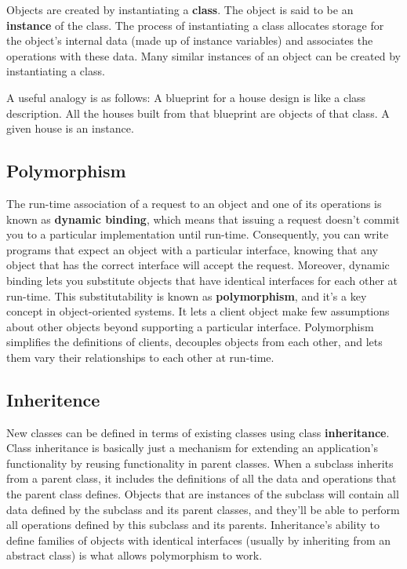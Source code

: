 \documentclass{article}
\begin{document}
Objects are created by instantiating a \textbf{class}. The object is said to be an \textbf{instance} of the class. The process of instantiating a class allocates storage for the object's internal data (made up of instance variables) and associates the operations with these data. Many similar instances of an object can be created by instantiating a class.

A useful analogy is as follows: A blueprint for a house design is like a class description. All the houses built from that blueprint are objects of that class. A given house is an instance.

\subsection{Polymorphism}

The run-time association of a request to an object and one of its operations is known as \textbf{dynamic binding}, which means that issuing a request doesn't commit you to a particular implementation until run-time. Consequently, you can write programs that expect an object with a particular interface, knowing that any object that has the correct interface will accept the request. Moreover, dynamic binding lets you substitute objects that have identical interfaces for each other at run-time. This substitutability is known as \textbf{polymorphism}, and it's a key concept in object-oriented systems. It lets a client object make few assumptions about other objects beyond supporting a particular interface. Polymorphism simplifies the definitions of clients, decouples objects from each other, and lets them vary their relationships to each other at run-time.

\subsection{Inheritence}

New classes can be defined in terms of existing classes using class \textbf{inheritance}. Class inheritance is basically just a mechanism for extending an application's functionality by reusing functionality in parent classes. When a subclass inherits from a parent class, it includes the definitions of all the data and operations that the parent class defines. Objects that are instances of the subclass will contain all data defined by the subclass and its parent classes, and they'll be able to perform all operations defined by this subclass and its parents. Inheritance's ability to define
families of objects with identical interfaces (usually by inheriting from an abstract class) is what allows polymorphism to work. 
\end{document}
